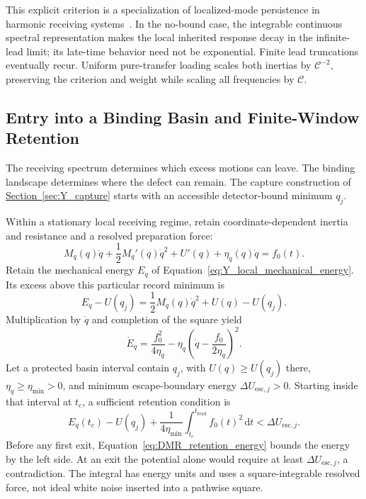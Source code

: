 This explicit criterion is a specialization of localized-mode persistence in harmonic receiving systems~\cite{DMR_IshikawaTodo2018}. In the no-bound case, the integrable continuous spectral representation makes the local inherited response decay in the infinite-lead limit; its late-time behavior need not be exponential. Finite lead truncations eventually recur. Uniform pure-transfer loading scales both inertias by $\mathcal C^{-2}$, preserving the criterion and weight while scaling all frequencies by $\mathcal C$.

\subsection{Entry into a Binding Basin and Finite-Window Retention}

The receiving spectrum determines which excess motions can leave. The binding landscape determines where the defect can remain. The capture construction of \hyperref[sec:Y_capture]{Section~\ref*{sec:Y_capture}} starts with an accessible detector-bound minimum $q_j$.

Within a stationary local receiving regime, retain coordinate-dependent inertia and resistance and a resolved preparation force:
\begin{equation}
 M_q(q)\ddot q+\frac12M_q'(q)\dot q^2+U'(q)
 +\eta_q(q)\dot q=f_0(t).
\label{eq:DMR_nonlinear_capture}
\end{equation}
Retain the mechanical energy $E_q$ of Equation~\eqref{eq:Y_local_mechanical_energy}. Its excess above this particular record minimum is
\begin{equation}
 E_q-U(q_j)=\frac12M_q(q)\dot q^2+U(q)-U(q_j).
\end{equation}
Multiplication by $\dot q$ and completion of the square yield
\begin{equation}
 \boxed{
 \dot E_q
 =\frac{f_0^2}{4\eta_q}
 -\eta_q\left(\dot q-\frac{f_0}{2\eta_q}\right)^2
 }.
\label{eq:DMR_retention_energy}
\end{equation}
Let a protected basin interval contain $q_j$, with $U(q)\geq U(q_j)$ there, $\eta_q\geq\eta_{\min}>0$, and minimum escape-boundary energy $\Delta U_{\mathrm{esc},j}>0$. Starting inside that interval at $t_c$, a sufficient retention condition is
\begin{equation}
 \boxed{
 E_q(t_c)-U(q_j)+\frac{1}{4\eta_{\min}}
 \int_{t_c}^{t_{\mathrm{read}}}f_0(t)^2\,\mathrm dt
 <\Delta U_{\mathrm{esc},j}
 }.
\label{eq:DMR_retention_criterion}
\end{equation}
Before any first exit, Equation~\eqref{eq:DMR_retention_energy} bounds the energy by the left side. At an exit the potential alone would require at least $\Delta U_{\mathrm{esc},j}$, a contradiction. The integral has energy units and uses a square-integrable resolved force, not ideal white noise inserted into a pathwise square.

